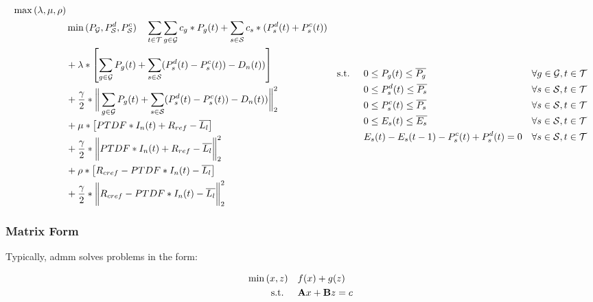 \begin{subequations}
	\begin{align}
		\max{(\lambda, \mu, \rho)}\\
		 & \min{(P_\mathcal{G}, P_\mathcal{S}^d, P_\mathcal{S}^c)} \quad \sum_{t\in\mathcal{T}}\sum_{g\in\mathcal{G}}c_g*P_g(t) + \sum_{s\in\mathcal{S}}c_s*(P_s^d(t)+P_s^c(t)) \nonumber \\
		 & + \lambda * \left[\sum_{g\in\mathcal{G}}P_g(t) + \sum_{s\in\mathcal{S}}(P_s^d(t)-P_s^c(t))-D_n(t))\right]\nonumber \\
		 & + \frac{\gamma}{2} * \bigg\|\sum_{g\in\mathcal{G}}P_g(t) + \sum_{s\in\mathcal{S}}(P_s^d(t)-P_s^c(t))-D_n(t))\bigg\|_2^2 \nonumber \\
		 & + \mu * \left[PTDF * I_n(t) + R_{ref} - \overline{L_l}\right] \nonumber \\
		 & + \frac{\gamma}{2} * \bigg\|PTDF * I_n(t) + R_{ref} - \overline{L_l}\bigg\|_2^2 \nonumber \\
		 & + \rho * \left[R_{cref} - PTDF * I_n(t) - \overline{L_l}\right]\nonumber \\
		 & + \frac{\gamma}{2} * \bigg\|R_{cref} - PTDF * I_n(t) - \overline{L_l}\bigg\|_2^2\nonumber
	\end{align}
	\begin{align}
		 \text{s.t. } \quad & 0 \leq P_g(t) \leq \overline{P_g} && \forall g \in \set{G}, t \in \set{T}\\\
		 & 0 \leq P_s^d(t) \leq \overline{P_s} && \forall s \in \set{S}, t \in \set{T}\\
		 & 0 \leq P_s^c(t) \leq \overline{P_s} && \forall s \in \set{S}, t \in \set{T}\\
		 & 0 \leq E_s(t) \leq \overline{E_s} && \forall s \in \set{S}, t \in \set{T}\\
		 & E_s(t) - E_s(t-1) - P_s^c(t) + P_s^d(t) = 0 && \forall s \in \set{S}, t \in \set{T}
	\end{align}
\end{subequations}

\subsubsection{Matrix Form}

Typically, \gls{admm} solves problems in the form:

\begin{subequations}
	\begin{align}
		\min{(x, z)} \quad & f(x) + g(z) \\
		\text{s.t. } \quad & \vb{A}x + \vb{B}z = c
	\end{align}
\end{subequations}

